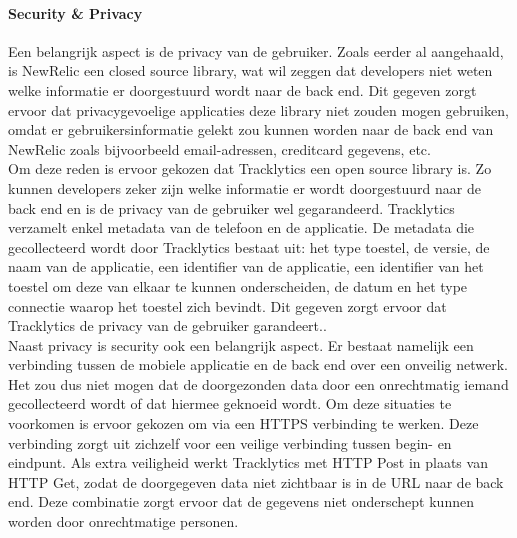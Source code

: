 \paragraph{Security \& Privacy}
Een belangrijk aspect is de privacy van de gebruiker. Zoals eerder al aangehaald, is NewRelic een closed source library, wat wil zeggen dat developers niet weten welke informatie er doorgestuurd wordt naar de back end. Dit gegeven zorgt ervoor dat privacygevoelige applicaties deze library niet zouden mogen gebruiken, omdat er gebruikersinformatie gelekt zou kunnen worden naar de back end van NewRelic zoals bijvoorbeeld email-adressen, creditcard gegevens, etc.\\
Om deze reden is ervoor gekozen dat Tracklytics een open source library is. Zo kunnen developers zeker zijn welke informatie er wordt doorgestuurd naar de back end en is de privacy van de gebruiker wel gegarandeerd. Tracklytics verzamelt enkel metadata van de telefoon en de applicatie. De metadata die gecollecteerd wordt door Tracklytics bestaat uit: het type toestel, de versie, de naam van de applicatie, een identifier van de applicatie, een identifier van het toestel om deze van elkaar te kunnen onderscheiden, de datum en het type connectie waarop het toestel zich bevindt. Dit gegeven zorgt ervoor dat Tracklytics de privacy van de gebruiker garandeert..\\

Naast privacy is security ook een belangrijk aspect. Er bestaat namelijk een verbinding tussen de mobiele applicatie en de back end over een onveilig netwerk. Het zou dus niet mogen dat de doorgezonden data door een onrechtmatig iemand gecollecteerd wordt of dat hiermee geknoeid wordt. Om deze situaties te voorkomen is ervoor gekozen om via een HTTPS verbinding te werken. Deze verbinding zorgt uit zichzelf voor een veilige verbinding tussen begin- en eindpunt. Als extra veiligheid werkt Tracklytics met HTTP Post in plaats van HTTP Get, zodat de doorgegeven data niet zichtbaar is in de URL naar de back end. Deze combinatie zorgt ervoor dat de gegevens niet onderschept kunnen worden door onrechtmatige personen. 




